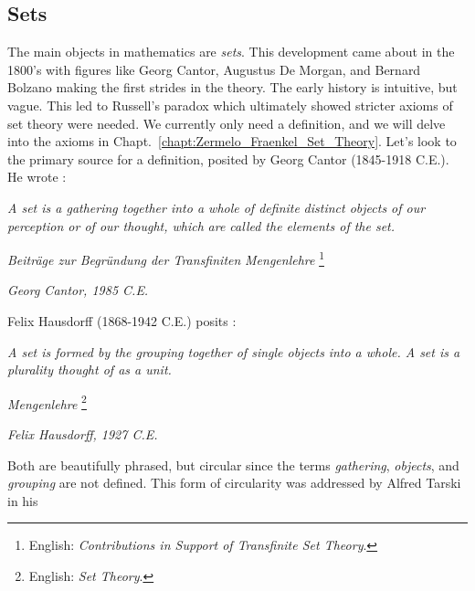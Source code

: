     \subsection{Sets}
        The main objects in mathematics are \textit{sets}. This development came
        about in the 1800's with figures like Georg Cantor,
        Augustus De Morgan, and Bernard
        Bolzano making the first strides in the theory.
        The early history is intuitive, but vague. This led to Russell's
        paradox which
        ultimately showed stricter axioms of set theory were needed. We
        currently only need a definition, and we will delve into the axioms in
        Chapt.~\ref{chapt:Zermelo_Fraenkel_Set_Theory}. Let's look to the
        primary source for a definition, posited by Georg Cantor
        (1845-1918 C.E.). He wrote \cite{Cantor1895}:
        \begin{center}
            \textit{A set is a gathering together into a whole of definite}
            \textit{distinct objects of our perception or of our thought, which}
            \textit{are called the elements of the set.}
            \par\hfill
            \textit{Beitr\"{a}ge zur Begr\"{u}ndung der Transfiniten}
            \textit{Mengenlehre}%
            \footnote{%
                English:
                \textit{Contributions in Support of Transfinite Set Theory}.%
            }
            \par\hfill
            \textit{Georg Cantor, 1985 C.E.}
        \end{center}
        Felix Hausdorff (1868-1942 C.E.) posits
        \cite[p.~11]{HausdorffSetTheory}:
        \begin{center}
            \textit{A set is formed by the grouping together of single objects}
            \textit{into a whole. A set is a plurality thought of as a unit.}
            \par\hfill
            \textit{Mengenlehre}%
            \footnote{%
                English:
                \textit{Set Theory}.%
            }
            \par\hfill
            \textit{Felix Hausdorff, 1927 C.E.}
        \end{center}
        Both are beautifully phrased, but circular since the terms
        \textit{gathering}, \textit{objects}, and \textit{grouping} are not
        defined. This form of circularity was addressed by Alfred Tarski in his
